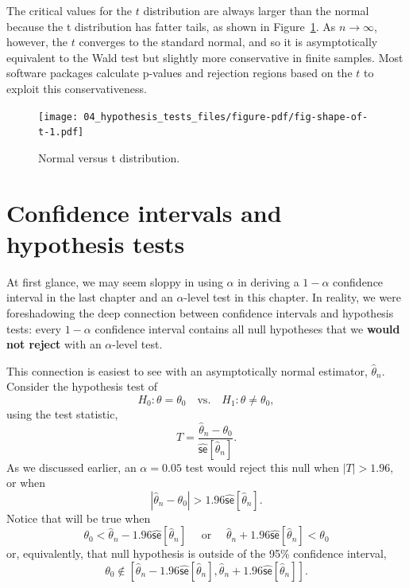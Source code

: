\documentclass[
  letterpaper,
  DIV=11,
  numbers=noendperiod]{scrreprt}
\newcommand{\se}{\textsf{se}}
\theoremstyle{definition}
\theoremstyle{definition}
\theoremstyle{plain}
\theoremstyle{remark}
\begin{document}
The critical values for the \(t\) distribution are always larger than
the normal because the t distribution has fatter tails, as shown in
Figure~\ref{fig-shape-of-t}. As \(n\to\infty\), however, the \(t\)
converges to the standard normal, and so it is asymptotically equivalent
to the Wald test but slightly more conservative in finite samples. Most
software packages calculate p-values and rejection regions based on the
\(t\) to exploit this conservativeness.

\begin{figure}

{\centering \texttt{[image: 04\_hypothesis\_tests\_files/figure-pdf/fig-shape-of-t-1.pdf]}

}

\caption{\label{fig-shape-of-t}Normal versus t distribution.}

\end{figure}

\hypertarget{confidence-intervals-and-hypothesis-tests}{%
\section{Confidence intervals and hypothesis
tests}\label{confidence-intervals-and-hypothesis-tests}}

At first glance, we may seem sloppy in using \(\alpha\) in deriving a
\(1 - \alpha\) confidence interval in the last chapter and an
\(\alpha\)-level test in this chapter. In reality, we were foreshadowing
the deep connection between confidence intervals and hypothesis tests:
every \(1-\alpha\) confidence interval contains all null hypotheses that
we \textbf{would not reject} with an \(\alpha\)-level test.

This connection is easiest to see with an asymptotically normal
estimator, \(\widehat{\theta}_n\). Consider the hypothesis test of \[ 
H_0: \theta = \theta_0 \quad \text{vs.}\quad H_1: \theta \neq \theta_0,
\] using the test statistic, \[ 
T = \frac{\widehat{\theta}_{n} - \theta_{0}}{\widehat{\se}[\widehat{\theta}_{n}]}. 
\] As we discussed earlier, an \(\alpha = 0.05\) test would reject this
null when \(|T| > 1.96\), or when \[ 
|\widehat{\theta}_{n} - \theta_{0}| > 1.96 \widehat{\se}[\widehat{\theta}_{n}]. 
\] Notice that will be true when \[ 
\theta_{0} < \widehat{\theta}_{n} - 1.96\widehat{\se}[\widehat{\theta}_{n}]\quad \text{ or }\quad \widehat{\theta}_{n} + 1.96\widehat{\se}[\widehat{\theta}_{n}] < \theta_{0}
\] or, equivalently, that null hypothesis is outside of the 95\%
confidence interval,
\[\theta_0 \notin \left[\widehat{\theta}_{n} - 1.96\widehat{\se}[\widehat{\theta}_{n}], \widehat{\theta}_{n} + 1.96\widehat{\se}[\widehat{\theta}_{n}]\right].\]
\end{document}
